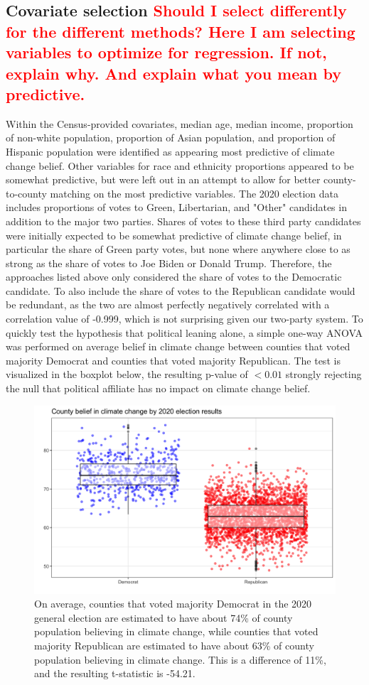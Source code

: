 \documentclass{article}
\begin{document}
\subsection{Covariate selection \textcolor{red}{Should I select differently for the different methods? Here I am selecting variables to optimize for regression. If not, explain why. And explain what you mean by predictive.}}
Within the Census-provided covariates, median age, median income, proportion of non-white population, proportion of Asian population, and proportion of Hispanic population were identified as appearing most predictive of climate change belief. Other variables for race and ethnicity proportions appeared to be somewhat predictive, but were left out in an attempt to allow for better county-to-county matching on the most predictive variables. The 2020 election data includes proportions of votes to Green, Libertarian, and "Other" candidates in addition to the major two parties. Shares of votes to these third party candidates were initially expected to be somewhat predictive of climate change belief, in particular the share of Green party votes, but none where anywhere close to as strong as the share of votes to Joe Biden or Donald Trump. Therefore, the approaches listed above only considered the share of votes to the Democratic candidate. To also include the share of votes to the Republican candidate would be redundant, as the two are almost perfectly negatively correlated with a correlation value of -0.999, which is not surprising given our two-party system. To quickly test the hypothesis that political leaning alone, a simple one-way ANOVA was performed on average belief in climate change between counties that voted majority Democrat and counties that voted majority Republican. The test is visualized in the boxplot below, the resulting p-value of $<0.01$ strongly rejecting the null that political affiliate has no impact on climate change belief.

\begin{figure}[H]
\centering
\includegraphics[scale=0.2]{images/election_party_anova.png}
\caption{On average, counties that voted majority Democrat in the 2020 general election are estimated to have about 74\% of county population believing in climate change, while counties that voted majority Republican are estimated to have about 63\% of county population believing in climate change. This is a difference of 11\%, and the resulting t-statistic is -54.21.}
\end{figure}
\end{document}
